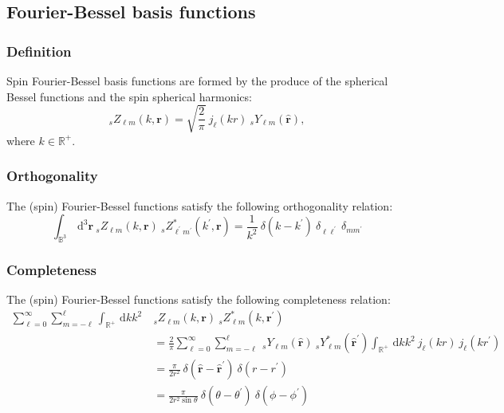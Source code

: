 \documentclass[a4paper,11pt]{article}
\newcommand{\realsnn}{\ensuremath{{\mathbb{R}^{+}}}}
\newcommand{\ball}{\ensuremath{{\mathbb{B}^3}}}
\newcommand{\dx}{\ensuremath{\mathrm{\,d}}}
\newcommand{\rvec}{{\boldsymbol{r}}}
\newcommand{\rang}{{\boldsymbol{\hat{r}}}}
\newcommand{\rlen}{{r}}
\begin{document}
\subsection{Fourier-Bessel basis functions}

\subsubsection{Definition}

Spin Fourier-Bessel basis functions are formed by the produce of the spherical Bessel functions and the spin spherical harmonics:
\begin{equation}
  {}_s Z_{\ell m}(k, \rvec) 
  = \sqrt{\frac{2}{\pi}}\:
  j_\ell(k \rlen) \: {}_s Y_{\ell m}(\rang) 
  ,
\end{equation}
where $k \in \realsnn$.

\subsubsection{Orthogonality}

The (spin) Fourier-Bessel functions satisfy the following orthogonality relation:
\begin{equation}
  \int_\ball \dx^3 \rvec \:
  {}_s Z_{\ell m}(k, \rvec) \:
  {}_s Z_{\ell^\prime m^\prime}^\ast(k^\prime, \rvec)   
   = 
  \frac{1}{k^2} \:
  \delta(k-k^\prime) \:
  \delta_{\ell \ell^\prime} \:
  \delta_{m m^\prime}   
\end{equation}


\subsubsection{Completeness}

The (spin) Fourier-Bessel functions satisfy the following completeness relation:
\begin{align}  
  \sum_{\ell=0}^\infty \sum_{m=-\ell}^{\ell}
  \int_{\realsnn} \dx k k^2 \:
  & {}_s Z_{\ell m}(k, \rvec) \:
  {}_s Z_{\ell m}^\ast(k, \rvec^\prime) \\ 
  & =   
  \frac{2}{\pi} \sum_{\ell=0}^\infty \sum_{m=-\ell}^{\ell} \:
  {}_s Y_{\ell m}(\rang) \:
  {}_s Y_{\ell m}^\ast(\rang^\prime) 
  \int_{\realsnn} \dx k k^2 \: j_\ell(k \rlen) \: j_\ell(k \rlen^\prime) \\
  & = 
  \frac{\pi}{2\rlen^2} \:
  \delta(\rang-\rang^\prime) \:
  \delta(\rlen-\rlen^\prime)\\
  & = 
  \frac{\pi}{2\rlen^2\sin\theta} \:
  \delta(\theta-\theta^\prime) \:
  \delta(\phi-\phi^\prime)
\end{align}
\end{document}
